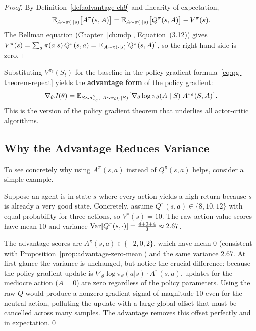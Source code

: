\begin{proof}
By Definition~\ref{def:advantage-ch9} and linearity of expectation,
\[
\operatorname{\mathbb{E}}_{A \sim \pi(\cdot|s)}\bigl[A^\pi(s, A)\bigr]
= \operatorname{\mathbb{E}}_{A \sim \pi(\cdot|s)}\bigl[Q^\pi(s, A)\bigr] - V^\pi(s).
\]
The Bellman equation (Chapter~\ref{ch:mdp}, Equation~(3.12)) gives
$V^\pi(s) = \sum_a \pi(a|s)\,Q^\pi(s,a)
           = \operatorname{\mathbb{E}}_{A \sim \pi(\cdot|s)}[Q^\pi(s,A)]$,
so the right-hand side is zero.
\end{proof}

Substituting $V^{\pi_\theta}(S_t)$ for the baseline in the policy gradient
formula~\eqref{eq:pg-theorem-repeat} yields the \textbf{advantage form} of
the policy gradient:
\begin{equation}
\label{eq:advantage-pg}
\nabla_\theta J(\theta)
= \operatorname{\mathbb{E}}_{S \sim d^\gamma_{\pi_\theta},\; A \sim \pi_\theta(\cdot|S)}
  \bigl[\nabla_\theta \log \pi_\theta(A \mid S)\; A^{\pi_\theta}(S, A)\bigr].
\end{equation}
This is the version of the policy gradient theorem that underlies all
actor-critic algorithms.

\subsection{Why the Advantage Reduces Variance}

To see concretely why using $A^\pi(s,a)$ instead of $Q^\pi(s,a)$ helps,
consider a simple example.

\begin{example}
\label{ex:advantage-variance}
Suppose an agent is in state $s$ where every action yields a high return
because $s$ is already a very good state.  Concretely, assume
$Q^\pi(s, a) \in \{8, 10, 12\}$ with equal probability for three actions,
so $V^\pi(s) = 10$.  The raw action-value scores have mean 10 and variance
$\operatorname{Var}[Q^\pi(s,\cdot)] = \frac{4+0+4}{3} \approx 2.67$.

The advantage scores are $A^\pi(s,a) \in \{-2, 0, 2\}$, which have mean 0
(consistent with Proposition~\ref{prop:advantage-zero-mean}) and the same
variance 2.67.  At first glance the variance is unchanged, but notice the
crucial difference: because the policy gradient update is
$\nabla_\theta \log \pi_\theta(a|s) \cdot A^\pi(s,a)$, updates for the
mediocre action ($A = 0$) are zero regardless of the policy parameters.
Using the raw $Q$ would produce a nonzero gradient signal of magnitude 10
even for the neutral action, polluting the update with a large global
offset that must be cancelled across many samples.  The advantage removes
this offset perfectly and in expectation.\qed
\end{example}

